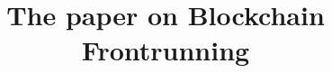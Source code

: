 \documentclass[envcountsect]{llncs}
\begin{document}
\frontmatter
\mainmatter

\title{The paper on \Large \bf Blockchain Frontrunning}





\maketitle














\clearpage
\appendix
\end{document}
